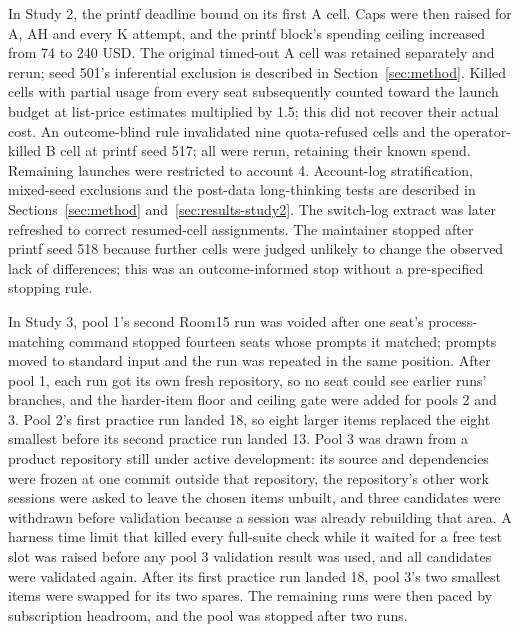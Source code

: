 In Study 2, the printf deadline bound on its first A cell. Caps were then raised for A, AH and every K attempt, and the printf block's spending ceiling increased from 74 to 240 USD. The original timed-out A cell was retained separately and rerun; seed 501's inferential exclusion is described in Section~\ref{sec:method}. Killed cells with partial usage from every seat subsequently counted toward the launch budget at list-price estimates multiplied by 1.5; this did not recover their actual cost. An outcome-blind rule invalidated nine quota-refused cells and the operator-killed B cell at printf seed 517; all were rerun, retaining their known spend. Remaining launches were restricted to account 4. Account-log stratification, mixed-seed exclusions and the post-data long-thinking tests are described in Sections~\ref{sec:method} and~\ref{sec:results-study2}. The switch-log extract was later refreshed to correct resumed-cell assignments. The maintainer stopped after printf seed 518 because further cells were judged unlikely to change the observed lack of differences; this was an outcome-informed stop without a pre-specified stopping rule.

In Study 3, pool 1's second Room15 run was voided after one seat's process-matching command stopped fourteen seats whose prompts it matched; prompts moved to standard input and the run was repeated in the same position. After pool 1, each run got its own fresh repository, so no seat could see earlier runs' branches, and the harder-item floor and ceiling gate were added for pools 2 and 3. Pool 2's first practice run landed 18, so eight larger items replaced the eight smallest before its second practice run landed 13. Pool 3 was drawn from a product repository still under active development: its source and dependencies were frozen at one commit outside that repository, the repository's other work sessions were asked to leave the chosen items unbuilt, and three candidates were withdrawn before validation because a session was already rebuilding that area. A harness time limit that killed every full-suite check while it waited for a free test slot was raised before any pool 3 validation result was used, and all candidates were validated again. After its first practice run landed 18, pool 3's two smallest items were swapped for its two spares. The remaining runs were then paced by subscription headroom, and the pool was stopped after two runs.

